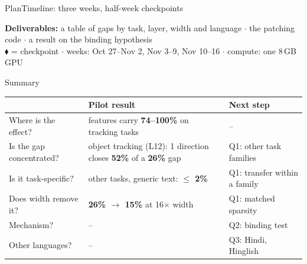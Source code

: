 \documentclass[aspectratio=169,10pt]{beamer}
\newcommand{\aside}[1]{{\color{ink2} #1}}
\newcommand{\stage}[1]{{\color{accent}#1}\;\textperiodcentered\;} %
\newcommand{\plan}[5]{%
  \fill[#4, rounded corners=2pt] (#1+0.06, -#3+0.3) rectangle (#2-0.06, -#3-0.3);
  \node[anchor=east, color=ink, font=\small] at (-0.1, -#3) {#5};}
\begin{document}
\begin{frame}{\stage{Plan}Timeline: three weeks, half-week checkpoints}
  \centering

  \vspace{6pt}
  {\small\textbf{Deliverables:} a table of gaps by task, layer, width and language \;$\cdot$\; the patching code
  \;$\cdot$\; a result on the binding hypothesis}\\[2pt]
  \aside{\small $\blacklozenge$ = checkpoint \;$\cdot$\; weeks: Oct 27--Nov 2, Nov 3--9, Nov 10--16 \;$\cdot$\; compute: one 8\,GB GPU}
\end{frame}

\begin{frame}{Summary}
  \vspace{4pt}
  \begin{center}\small
  \renewcommand{\arraystretch}{1.4}
  \begin{tabularx}{\textwidth}{@{}l X X@{}}
    \toprule
    & \textbf{Pilot result} & \textbf{Next step} \\
    \midrule
    Where is the effect? & features carry \textbf{74--100\%} on tracking tasks & -- \\
    Is the gap concentrated? & object tracking (L12): 1 direction closes \textbf{52\%} of a \textbf{26\%} gap & Q1: other task families \\
    Is it task-specific? & other tasks, generic text: \textbf{$\leq$ 2\%} & Q1: transfer within a family \\
    Does width remove it? & \textbf{26\% $\to$ 15\%} at 16$\times$ width & Q1: matched sparsity \\
    Mechanism? & -- & Q2: binding test \\
    Other languages? & -- & Q3: Hindi, Hinglish \\
    \bottomrule
  \end{tabularx}
  \end{center}
\end{frame}
\end{document}
